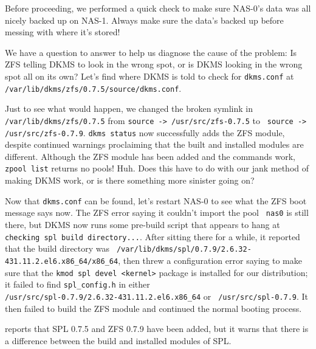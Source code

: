 \documentclass[12pt]{article}
\begin{document}
\begin{tcolorbox}[title=ASIDE, colback=white, colframe=blue]
  Before proceeding, we performed a quick check to make sure NAS-0's
  data was all nicely backed up on NAS-1. Always make sure the data's backed up
  before messing with where it's stored!
\end{tcolorbox}

\qq We have a question to answer to help us diagnose the cause of the problem:
Is ZFS telling DKMS to look in the wrong spot, or is DKMS looking in the wrong
spot all on its own? Let's find where DKMS is told to check for {\tt dkms.conf}
at {\tt /var/lib/dkms/zfs/0.7.5/source/dkms.conf}.

\qq Just to see what would happen, we changed the broken symlink in {\tt
  /var/lib/dkms/zfs/0.7.5} from {\tt source -> /usr/src/zfs-0.7.5} to {\tt
  source -> /usr/src/zfs-0.7.9}. {\tt dkms status} now successfully adds the ZFS
module, despite continued warnings proclaiming that the built and installed
modules are different. Although the ZFS module has been added and the commands
work, {\tt zpool list} returns no pools! Huh. Does this have to do with our jank
method of making DKMS work, or is there something more sinister going on?

\qq Now that {\tt dkms.conf} can be found, let's restart NAS-0 to see what the
ZFS boot message says now. The ZFS error saying it couldn't import the pool {\tt
  nas0} is still there, but DKMS now runs some pre-build script that appears to
hang at {\tt checking spl build directory...}. After sitting there for a while,
it reported that the build directory was {\tt
  /var/lib/dkms/spl/0.7.9/2.6.32-431.11.2.el6.x86\_64/x86\_64}, then threw a
configuration error saying to make sure that the {\tt kmod spl devel <kernel>}
package is installed for our distribution; it failed to find {\tt spl\_config.h}
in either\\ {\tt /usr/src/spl-0.7.9/2.6.32-431.11.2.el6.x86\_64} or {\tt
  /usr/src/spl-0.7.9}. It then failed to build the ZFS module and continued the
normal booting process.

 reports that SPL 0.7.5 and ZFS 0.7.9 have been added, but
it warns that there is a difference between the build and installed modules of
SPL.
\end{document}
